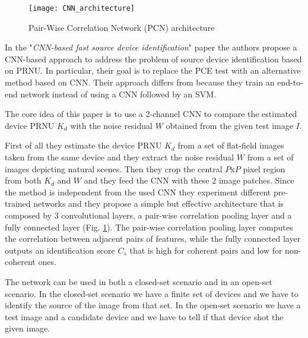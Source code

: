 \begin{figure}[ht!]
    \centering
    \texttt{[image: CNN\_architecture]}
    \caption{Pair-Wise Correlation Network (PCN) architecture}
    \label{fig:CNN_architecture}
\end{figure}

In the "\textit{CNN-based fast source device identification}" \cite{Mandelli} paper the authors propose a CNN-based approach to address the problem of source device identification based on PRNU. 
In particular, their goal is to replace the PCE test with an alternative method based on CNN. Their approach differs from \cite{Bondi}
because they train an end-to-end network instead of using a CNN followed by an SVM.

The core idea of this paper is to use a 2-channel CNN to compare the estimated device PRNU $K_d$ with the noise residual $W$ 
obtained from the given test image $I$.

First of all they estimate the device PRNU\cite{Lukas} $K_d$ from a set of flat-field images taken from the same device and they extract the
noise residual $W$ from a set of images depicting natural scenes.
Then they crop the central $P$x$P$ pixel region from both $K_d$ and $W$ and they feed the CNN with these 2 image patches.
Since the method is independent from the used CNN they experiment different pre-trained networks and they propose a simple but 
effective architecture that is composed by 3 convolutional layers, a pair-wise correlation pooling layer and a fully connected 
layer (Fig. \ref{fig:CNN_architecture}). The pair-wise correlation pooling layer computes the correlation between adjacent pairs of features, while the
fully connected layer outputs an identification score $C_s$ that is high for coherent pairs and low for non-coherent ones. 

The network can be used in both a closed-set scenario and in an open-set scenario. In the closed-set scenario we have a finite set 
of devices and we have to identify the source of the image from that set. In the open-set scenario we have a test image and a candidate
device and we have to tell if that device shot the given image.

